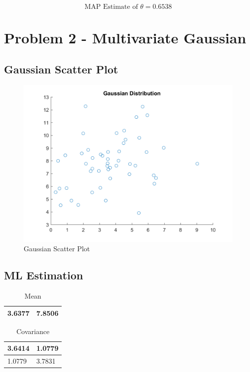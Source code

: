 \documentclass[12pt, letterpaper]{report}
\begin{document}
\[ \textrm{MAP Estimate of } \theta = 0.6538 \]

\section{Problem 2 - Multivariate Gaussian}

\subsection{Gaussian Scatter Plot}

\begin{figure}[H]
	\centering
	\includegraphics[width=0.7\columnwidth]{p2a.png}
	\caption{Gaussian Scatter Plot}
\end{figure}

\subsection{ML Estimation}

\begin{table}[H]
	\centering
	\begin{tabular}{ |l|l| }
		\hline
		3.6377 & 7.8506 \\
		\hline
	\end{tabular}
	\caption{Mean}
\end{table}

\begin{table}[H]
	\centering
	\begin{tabular}{ |l|l| }
		\hline
		3.6414 & 1.0779 \\
		\hline
		1.0779 & 3.7831 \\
		\hline
	\end{tabular}
	\caption{Covariance}
\end{table}
\end{document}
